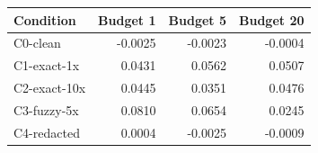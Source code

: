 \begin{tabular}{lrrr}
\toprule
Condition & Budget 1 & Budget 5 & Budget 20 \\
\midrule
C0-clean & -0.0025 & -0.0023 & -0.0004 \\
C1-exact-1x & 0.0431 & 0.0562 & 0.0507 \\
C2-exact-10x & 0.0445 & 0.0351 & 0.0476 \\
C3-fuzzy-5x & 0.0810 & 0.0654 & 0.0245 \\
C4-redacted & 0.0004 & -0.0025 & -0.0009 \\
\bottomrule
\end{tabular}
